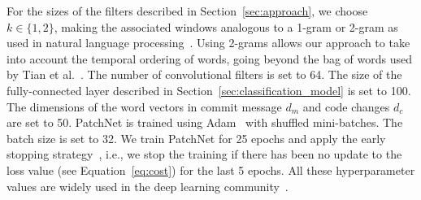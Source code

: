 


For the sizes of the filters described in Section~\ref{sec:approach}, we choose $k \in \{1, 2\}$, making the associated
windows analogous to a 1-gram or 2-gram as used in natural language
processing~\cite{jurafsky2014speech, brown1992class}. 
  Using 2-grams
allows our approach to take into account the temporal ordering of words,
going beyond the bag of words used by Tian et
al.~\cite{tian2012identifying}. The number of convolutional filters is set
to 64. The size of the fully-connected layer described in Section~\ref{sec:classification_model} is set to 100. The
dimensions of the word vectors in commit message $d_m$ and code changes
$d_c$ are set to 50. PatchNet is trained using Adam~\cite{kingma2014adam}
with shuffled
mini-batches. The batch size is set to 32. We train PatchNet for 25 epochs
and apply the early stopping strategy~\cite{prechelt1998automatic, caruana2001overfitting}, i.e.,
we stop the training if there has been no update to the loss value (see
Equation~\ref{eq:cost}) for the last 5 epochs. All these hyperparameter values
are widely used in the deep learning community~\cite{severyn2015learning, huo2016learning, huo2017enhancing, hinton2012improving}. 

